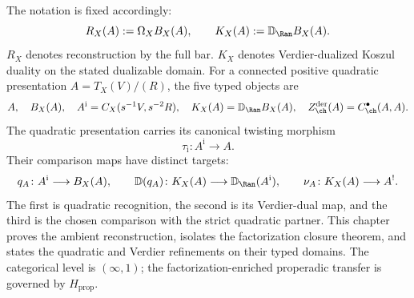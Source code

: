 The notation is fixed accordingly:
\[
 R_X(A):=\Omega_XB_X(A),
 \qquad
 K_X(A):=\mathbb D_{\Ran}B_X(A).
\]
$R_X$ denotes reconstruction by the full bar.  $K_X$ denotes
Verdier-dualized Koszul duality on the stated dualizable domain.  For
a connected positive quadratic presentation $A=T_X(V)/(R)$, the five
typed objects are
\[
 A,\quad B_X(A),\quad
 A^{\mathrm i}=C_X(s^{-1}V,s^{-2}R),\quad
 K_X(A)=\mathbb D_{\Ran}B_X(A),\quad
 Z_{\ch}^{\mathrm{der}}(A)=C^\bullet_{\ch}(A,A).
\]
The quadratic presentation carries its canonical twisting morphism
\[
 \tau_{\mathrm i}\colon A^{\mathrm i}\longrightarrow A.
\]
Their comparison maps have distinct targets:
\[
 q_A\colon A^{\mathrm i}\longrightarrow B_X(A),\qquad
 \mathbb D(q_A)\colon K_X(A)\longrightarrow
 \mathbb D_{\Ran}(A^{\mathrm i}),\qquad
 \nu_A\colon K_X(A)\longrightarrow A^!.
\]
The first is quadratic recognition, the second is its Verdier-dual
map, and the third is the chosen comparison with the strict quadratic
partner.  This chapter
proves the ambient reconstruction, isolates the factorization closure
theorem, and states the quadratic and Verdier refinements on their
typed domains.  The categorical level is $(\infty,1)$; the
factorization-enriched properadic transfer is governed by
$H_{\mathrm{prop}}$.

